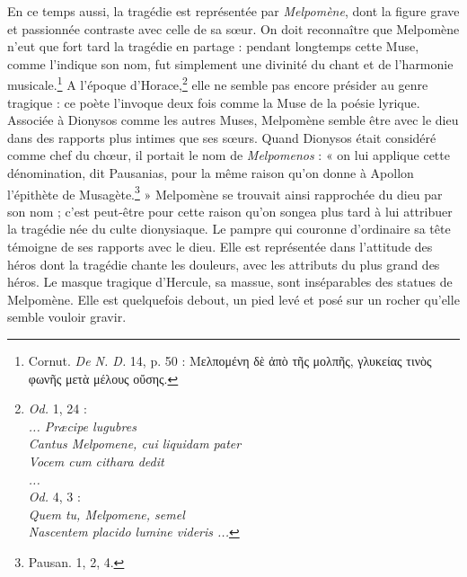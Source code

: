 \documentclass[landscape, a4paper, 11pt, oneside, polutonikogreek, french]{article}
\begin{document}
En ce temps aussi, la tragédie est représentée par \emph{Melpomène}, dont la figure grave et passionnée contraste avec celle de sa sœur. On doit reconnaître que Melpomène n'eut que fort tard la tragédie en partage : pendant longtemps cette Muse, comme l'indique son nom, fut simplement une divinité du chant et de l'harmonie musicale.\footnote{Cornut. \emph{De N. D.} 14, p. 50 : Μελπομένη δὲ ἀπὸ τῆς μολπῆς, γλυκείας τινὸς φωνῆς μετὰ μέλους οὔσης.} A l'époque d'Horace,\footnote{\emph{Od.} 1, 24 :\\\hspace*{10mm}\emph{... Præcipe lugubres}\\\hspace*{10mm}\emph{Cantus Melpomene, cui liquidam pater}\\\hspace*{10mm}\emph{Vocem cum cithara dedit}\\\hspace*{10mm}\emph{...}\\\hspace*{5mm}\emph{Od.} 4, 3 :\\\hspace*{10mm}\emph{Quem tu, Melpomene, semel}\\\hspace*{10mm}\emph{Nascentem placido lumine videris ...}} elle ne semble pas encore présider au genre tragique : ce poète l'invoque deux fois comme la Muse de la poésie lyrique. Associée à Dionysos comme les autres Muses, Melpomène semble être avec le dieu dans des rapports plus intimes que ses sœurs. Quand Dionysos était considéré comme chef du chœur, il portait le nom de \emph{Melpomenos} : « on lui applique cette dénomination, dit Pausanias, pour la même raison qu'on donne à Apollon l'épithète de Musagète.\footnote{Pausan. 1, 2, 4.} » Melpomène se trouvait ainsi rapprochée du dieu par son nom ; c'est peut-être pour cette raison qu'on songea plus tard à lui attribuer la tragédie née du culte dionysiaque. Le pampre qui couronne d'ordinaire sa tête témoigne de ses rapports avec le dieu. Elle est représentée dans l'attitude des héros dont la tragédie chante les douleurs, avec les attributs du plus grand des héros. Le masque tragique d'Hercule, sa massue, sont inséparables des statues de Melpomène. Elle est quelquefois debout, un pied levé et posé sur un rocher qu'elle semble vouloir gravir.
\end{document}
